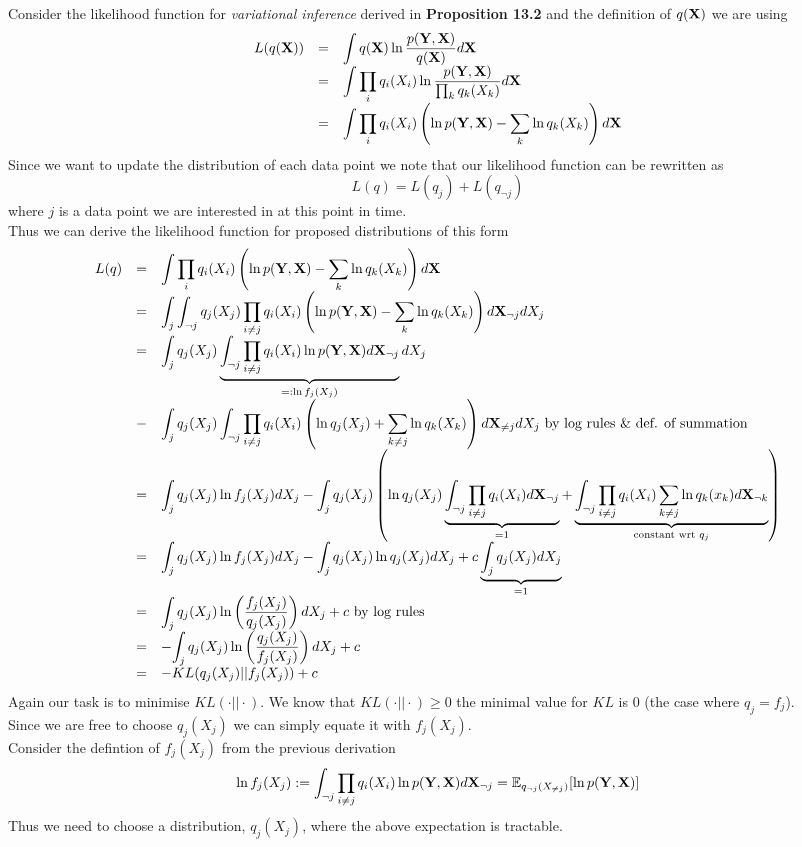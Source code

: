 \documentclass[11pt,a4paper]{article}
\begin{document}
Consider the likelihood function for \textit{variational inference} derived in \textbf{Proposition 13.2} and the definition of $q(\textbf{X})$ we are using
\[\begin{array}{rcl}
L(q(\textbf{X}))&=&\displaystyle\int q(\textbf{X})\ln\dfrac{p(\textbf{Y},\textbf{X})}{q(\textbf{X})}d\textbf{X}\\
&=&{\displaystyle\int\prod_iq_i(X_i)\ln\dfrac{p(\textbf{Y},\textbf{X})}{\prod_kq_k(X_k)}d\textbf{X}}\\
&=&{\displaystyle\int\prod_iq_i(X_i)\left(\ln p(\textbf{Y},\textbf{X})-\sum_k\ln q_k(X_k)\right)d\textbf{X}}
\end{array}\]
Since we want to update the distribution of each data point we note that our likelihood function can be rewritten as
$$L(q)=L(q_j)+L(q_{\neg j})$$
where $j$ is a data point we are interested in at this point in time.\\
Thus we can derive the likelihood function for proposed distributions of this form
\[\begin{array}{rcl}
L(q)&=&{\displaystyle\int\prod_iq_i(X_i)\left(\ln p(\textbf{Y},\textbf{X})-\sum_k\ln q_k(X_k)\right)d\textbf{X}}\\
&=&{\displaystyle\int_j\int_{\neg j}q_j(X_j)\prod_{i\neq j}q_i(X_i)\left(\ln p(\textbf{Y},\textbf{X})-\sum_k\ln q_k(X_k)\right)d\textbf{X}_{\neg j}dX_j}\\
&=&{\displaystyle\int_jq_j(X_j)\underbrace{\int_{\neg j}\prod_{i\neq j}q_i(X_i)\ln p(\textbf{Y},\textbf{X})d\textbf{X}_{\neg j}}_{=:\ln f_j(X_j)}dX_j}\\
&-&{\displaystyle\int_jq_j(X_j)\int_{\neg j}\prod_{i\neq j}q_i(X_i)\left(\ln q_j(X_j)+\sum_{k\neq j}\ln q_k(X_k)\right)d\textbf{X}_{\neq j}dX_j}\text{ by log rules \& def. of summation}\\
&=&{\displaystyle\int_jq_j(X_j)\ln f_j(X_j)dX_j}-{\displaystyle\int_jq_j(X_j)\left(\ln q_j(X_j)\underbrace{\int_{\neg j}\prod_{i\neq j}q_i(X_i)d\textbf{X}_{\neg j}}_{=1}+\underbrace{\int_{\neg j}\prod_{i\neq j}q_i(X_i)\sum_{k\neq j}\ln q_k(x_k)d\textbf{X}_{\neg k}}_\text{constant wrt $q_j$}\right)}\\
&=&{\displaystyle\int_jq_j(X_j)\ln f_j(X_j)dX_j-\int_jq_j(X_j)\ln q_j(X_j)dX_j+c\underbrace{\int_jq_j(X_j)dX_j}_{=1}}\\
&=&{\displaystyle\int_jq_j(X_j)\ln\left(\dfrac{f_j(X_j)}{q_j(X_j)}\right)dX_j+c}\text{ by log rules}\\
&=&-{\displaystyle\int_jq_j(X_j)\ln\left(\dfrac{q_j(X_j)}{f_j(X_j)}\right)dX_j+c}\\
&=&-KL(q_j(X_j)||f_j(X_j))+c
\end{array}\]
Again our task is to minimise $KL(\cdot||\cdot)$. We know that $KL(\cdot||\cdot)\geq0$ the minimal value for $KL$ is 0 (the case where $q_j=f_j$).\\
Since we are free to choose $q_j(X_j)$ we can simply equate it with $f_j(X_j)$.\\
Consider the defintion of $f_j(X_j)$ from the previous derivation
$$\ln f_j(X_j):=\int_{\neg j}\prod_{i\neq j}q_i(X_i)\ln p(\textbf{Y},\textbf{X})d\textbf{X}_{\neg j}=\mathbb{E}_{q_{\neg j}(X_{\neq j})}[\ln p(\textbf{Y},\textbf{X})]$$
Thus we need to choose a distribution, $q_j(X_j)$, where the above expectation is tractable.\\
\end{document}
